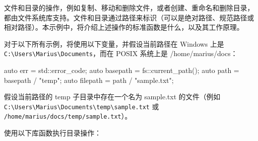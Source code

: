 文件和目录的操作，例如复制、移动和删除文件，或者创建、重命名和删除目录，都由文件系统库支持。文件和目录通过路径来标识（可以是绝对路径、规范路径或相对路径）。本示例中，将介绍上述操作的标准函数是什么，以及其工作原理。


对于以下所有示例，将使用以下变量，并假设当前路径在 Windows 上是 \verb|C:\Users\Marius\Documents|，而在 POSIX 系统上是 /home/marius/docs：

\begin{cpp}
auto err = std::error_code{};
auto basepath = fs::current_path();
auto path = basepath / "temp";
auto filepath = path / "sample.txt";
\end{cpp}

假设当前路径的 temp 子目录中存在一个名为 sample.txt 的文件（例如 \verb|C:\Users\Marius\Documents\temp\sample.txt| 或 \verb|/home/marius/docs/temp/sample.txt|）。


使用以下库函数执行目录操作：

